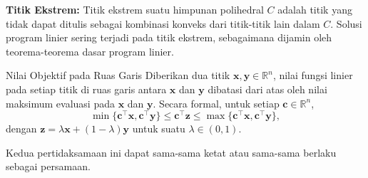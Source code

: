 \textbf{Titik Ekstrem:}  
Titik ekstrem suatu himpunan polihedral \(C\) adalah titik yang tidak dapat ditulis sebagai kombinasi konveks dari titik-titik lain dalam \(C\). Solusi program linier sering terjadi pada titik ekstrem, sebagaimana dijamin oleh teorema-teorema dasar program linier.

\begin{lemma}{Nilai Objektif pada Ruas Garis}
\label{lemma:objective_bound}
Diberikan dua titik \(\mathbf{x}, \mathbf{y} \in \mathbb{R}^n\), nilai fungsi linier pada setiap titik di ruas garis antara \(\mathbf{x}\) dan \(\mathbf{y}\) dibatasi dari atas oleh nilai maksimum evaluasi pada \(\mathbf{x}\) dan \(\mathbf{y}\). Secara formal, untuk setiap \(\mathbf{c} \in \mathbb{R}^n\),
\[
\min\{\mathbf{c}^\top \mathbf{x}, \mathbf{c}^\top \mathbf{y}\} \leq \mathbf{c}^\top \mathbf{z} \leq \max\{\mathbf{c}^\top \mathbf{x}, \mathbf{c}^\top \mathbf{y}\},
\]
dengan \(\mathbf{z} = \lambda \mathbf{x} + (1-\lambda) \mathbf{y}\) untuk suatu $\lambda \in (0,1)$.

Kedua pertidaksamaan ini dapat sama-sama ketat atau sama-sama berlaku sebagai persamaan.
\end{lemma}

